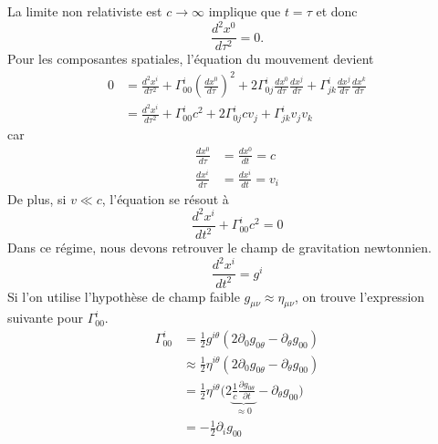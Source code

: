 \documentclass[a4paper,11pt]{report}
\theoremstyle{definition}
\theoremstyle{plain}
\theoremstyle{definition}
\theoremstyle{remark}
\newcommand{\p}{\partial}
\begin{document}
            La limite non relativiste est $c\to\infty$ implique que $t = \tau$ et donc
            \begin{equation}
                \frac{d^2x^0}{d\tau^2} = 0.
            \end{equation}
            Pour les composantes spatiales, l'équation du mouvement devient
            \begin{align}
                 0 &=\frac{d^2x^i}{d\tau^2} + \Gamma^i_{00}\left( \frac{dx^0}{d\tau} \right)^2 + 2\Gamma^i_{0j}\frac{dx^0}{d\tau}\frac{dx^j}{d\tau}+\Gamma^i_{jk}\frac{dx^j}{d\tau}\frac{dx^k}{d\tau}\\
                 &= \frac{d^2x^i}{d\tau^2} + \Gamma^i_{00}c^2 + 2\Gamma^i_{0j}cv_j+\Gamma^i_{jk}v_jv_k
            \end{align}
            car
            \begin{align}
                \frac{dx^0}{d\tau} &= \frac{dx^0}{dt} = c \\
                \frac{dx^i}{d\tau} &= \frac{dx^i}{dt} = v_i
            \end{align}
            De plus, si $v\ll c $, l'équation se résout à
            \begin{equation}
                 \frac{d^2x^i}{dt^2} + \Gamma^i_{00}c^2 = 0
            \end{equation}
            Dans ce régime, nous devons retrouver le champ de gravitation newtonnien.
            \begin{equation}
                \frac{d^2x^i}{dt^2} = g^i
            \end{equation}
            Si l'on utilise l'hypothèse de champ faible $g_{\mu\nu}\approx \eta_{\mu\nu}$, on trouve l'expression suivante pour $\Gamma^i_{00}$.
            \begin{align}
                \Gamma^i_{00} &= \frac{1}{2}g^{i\theta}\left( 2\p_0g_{0\theta}-\p_\theta g_{00} \right) \\
                &\approx  \frac{1}{2}\eta^{i\theta}\left( 2\p_0g_{0\theta}-\p_\theta g_{00} \right) \\
                &=  \frac{1}{2}\eta^{i\theta}\bigg( 2\underbrace{\frac{1}{c}\frac{\p g_{0\theta}}{\p t}}_{\approx 0}-\p_\theta g_{00} \bigg) \\
                &= -\frac{1}{2}\p_i g_{00}
            \end{align}
            
\end{document}
